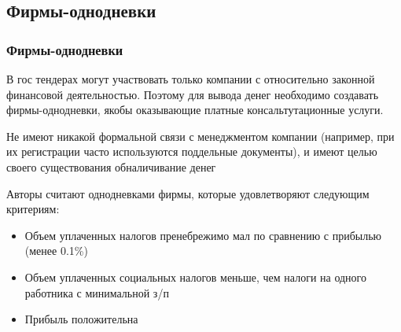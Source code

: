 \subsection{Фирмы-однодневки}

\begin{frame}

\frametitle{Фирмы-однодневки}
В гос тендерах могут участвовать только компании с относительно законной финансовой деятельностью. Поэтому для вывода денег необходимо создавать фирмы-однодневки, якобы оказывающие платные консальтутационные услуги.
\vspace{3mm}

Не имеют никакой формальной связи с менеджментом компании (например, при их регистрации часто используются поддельные документы), и имеют целью своего существования обналичивание денег
\vspace{3mm}

Авторы считают однодневками фирмы, которые удовлетворяют следующим критериям:
\begin{itemize}
\item Объем уплаченных налогов пренебрежимо мал по сравнению с прибылью (менее 0.1\%)
\item Объем уплаченных социальных налогов меньше, чем налоги на одного работника с минимальной з/п
\item Прибыль положительна
\end{itemize}

\end{frame}